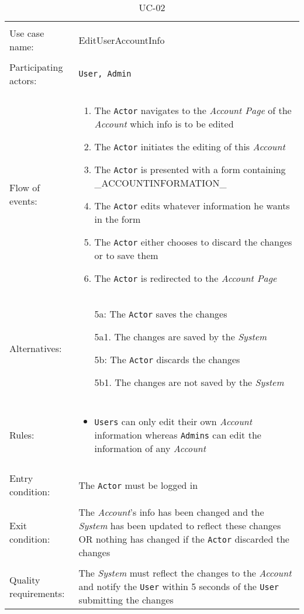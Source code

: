 \documentclass[../report.tex]{subfiles}
\begin{document}
\noindent
\begin{table}
\caption{UC-02}
\label{UC-02}
\begin{tabular}{ l  p{8cm} } 
\hline 
\\
Use case name:  & EditUserAccountInfo   \\   \hline    
\\            
Participating actors:  & \texttt{User, \texttt{Admin}} \\   \hline   
\\      
Flow of events: & \begin{enumerate}
\item{The \texttt{Actor} navigates to the \textit{Account Page} of the \textit{Account} which info is to be edited}
\item{The \texttt{Actor} initiates the editing of this \textit{Account}}
\item{The \texttt{Actor} is presented with a form containing \_ACCOUNTINFORMATION\_}
\item{The \texttt{Actor} edits whatever information he wants in the form}
\item{The \texttt{Actor} either chooses to discard the changes or to save them}
\item{The \texttt{Actor} is redirected to the \textit{Account Page}}
\end{enumerate}
\\
Alternatives: & \begin{itemize}
\item[5a:]{The \texttt{Actor} saves the changes}
\item[]  5a1. The changes are saved by the \textit{System}
\item[5b:]{The \texttt{Actor} discards the changes}
\item[]  5b1. The changes are not saved by the \textit{System}
\end{itemize}
\\ \hline
\\
Rules: & \begin{itemize}
\item{\texttt{Users} can only edit their own \textit{Account} information whereas \texttt{Admins} can edit the information of any  \textit{Account}}
\end{itemize}
\\   \hline 
\\
Entry condition: & The \texttt{Actor} must be logged in \\ \hline
\\
Exit condition: & The \textit{Account}'s info has been changed and the \textit{System} has been updated to reflect these changes OR
nothing has changed if the \texttt{Actor} discarded the changes\\ \hline
\\
Quality requirements: & The \textit{System} must reflect the changes to the \textit{Account} and notify the \texttt{User} within 5 seconds of the \texttt{User} submitting the changes \\ \hline  
\end{tabular}
\end{table}
\end{document}
